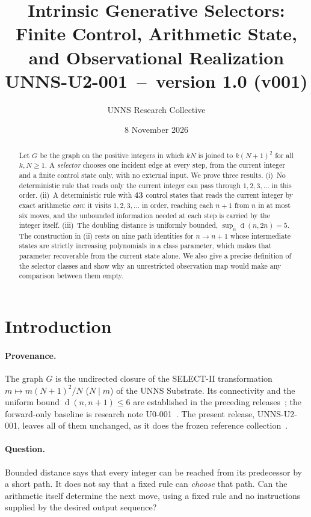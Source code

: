 \documentclass[11pt]{article}
\title{\textbf{Intrinsic Generative Selectors:\\ Finite Control, Arithmetic State, and Observational Realization}\\[4pt]
\large UNNS-U2-001 \,--\, version 1.0 (v001)}
\author{UNNS Research Collective}
\date{8 November 2026}
\theoremstyle{definition}
\newcommand{\dist}{\operatorname{d}}
\begin{document}
\maketitle

\begin{abstract}
\noindent Let $G$ be the graph on the positive integers in which $kN$ is joined to $k(N+1)^2$ for all $k,N\ge1$.
A \emph{selector} chooses one incident edge at every step, from the current integer and a finite control state only,
with no external input. We prove three results. (i)~No deterministic rule that reads only the current integer
can pass through $1,2,3,\dots$ in this order. (ii)~A deterministic rule with $43$ control states that reads the
current integer by exact arithmetic \emph{can}: it visits $1,2,3,\dots$ in order, reaching each $n+1$ from $n$ in at most six
moves, and the unbounded information needed at each step is carried by the integer itself. (iii)~The doubling
distance is uniformly bounded, $\sup_{n}\dist(n,2n)=5$. The construction in (ii) rests on nine path identities
for $n\to n+1$ whose intermediate states are strictly increasing polynomials in a class parameter, which
makes that parameter recoverable from the current state alone. We also give a precise definition of the selector classes
and show why an unrestricted observation map would make any comparison between them empty.
\end{abstract}

\section{Introduction}\label{sec:intro}
\paragraph{Provenance.} The graph $G$ is the undirected closure of the SELECT-II transformation
$m\mapsto m(N+1)^2/N$ ($N\mid m$) of the UNNS Substrate. Its connectivity and the uniform bound
$\dist(n,n+1)\le6$ are established in the preceding releases~\cite{u1bnd,u1}; the forward-only baseline is
research note U0-001~\cite{u0}. The present release, UNNS-U2-001, leaves all of them unchanged, as it does the
frozen reference collection~\cite{gig,repo}.

\paragraph{Question.} Bounded distance says that every integer can be reached from its predecessor by a short
path. It does not say that a fixed rule can \emph{choose} that path. Can the arithmetic itself determine the next move,
using a fixed rule and no instructions supplied by the desired output sequence?
\end{document}
